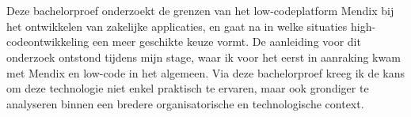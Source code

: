 
%
%
%
%
%

%



\chapter{}
\label{ch:samenvatting}


Deze bachelorproef onderzoekt de grenzen van het low-codeplatform Mendix bij het ontwikkelen van zakelijke applicaties, en gaat na in welke situaties high- codeontwikkeling een meer geschikte keuze vormt. De aanleiding voor dit onderzoek ontstond tijdens mijn stage, waar ik voor het eerst in aanraking kwam met Mendix en low-code in het algemeen. Via deze bachelorproef kreeg ik de kans om deze technologie niet enkel praktisch te ervaren, maar ook grondiger te analyseren binnen een bredere organisatorische en technologische context.

